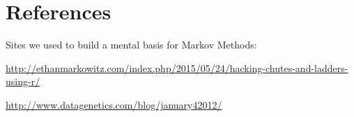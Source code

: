 \section{References}

Sites we used to build a mental basis for Markov Methods:

\url{http://ethanmarkowitz.com/index.php/2015/05/24/hacking-chutes-and-ladders-using-r/}

\url{http://www.datagenetics.com/blog/january42012/}


